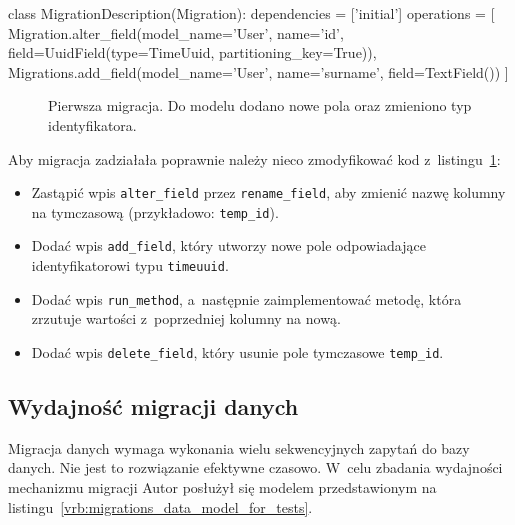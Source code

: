 \begin{verbbox}[\footnotesize]
class MigrationDescription(Migration):
    dependencies = ['initial']
    operations = [
        Migration.alter_field(model_name='User',
            name='id',
            field=UuidField(type=TimeUuid, partitioning_key=True)),
        Migrations.add_field(model_name='User',
            name='surname',
            field=TextField())
    ]
\end{verbbox}

\begin{figure}[ht!]
	\centering
	\theverbbox
	\caption{Pierwsza migracja. Do modelu dodano nowe pola oraz zmieniono typ identyfikatora.}
	\label{vrb:first_migration}
\end{figure}

Aby migracja zadziałała poprawnie należy nieco zmodyfikować kod z~listingu~\ref{vrb:first_migration}:

\begin{itemize}
	\item Zastąpić wpis \verb+alter_field+ przez \verb+rename_field+, aby zmienić nazwę kolumny na tymczasową (przykładowo: \verb+temp_id+).
	\item Dodać wpis \verb+add_field+, który utworzy nowe pole odpowiadające identyfikatorowi typu \verb+timeuuid+.
	\item Dodać wpis \verb+run_method+, a~następnie zaimplementować metodę, która zrzutuje wartości z~poprzedniej kolumny na nową.
	\item Dodać wpis \verb+delete_field+, który usunie pole tymczasowe \verb+temp_id+.
\end{itemize}

\subsection{Wydajność migracji danych}
\label{sec:ocm_migrations_performance}

Migracja danych wymaga wykonania wielu sekwencyjnych zapytań do bazy danych. Nie jest to rozwiązanie efektywne czasowo. W~celu zbadania wydajności mechanizmu migracji Autor posłużył się modelem przedstawionym na listingu~\ref{vrb:migrations_data_model_for_tests}.


